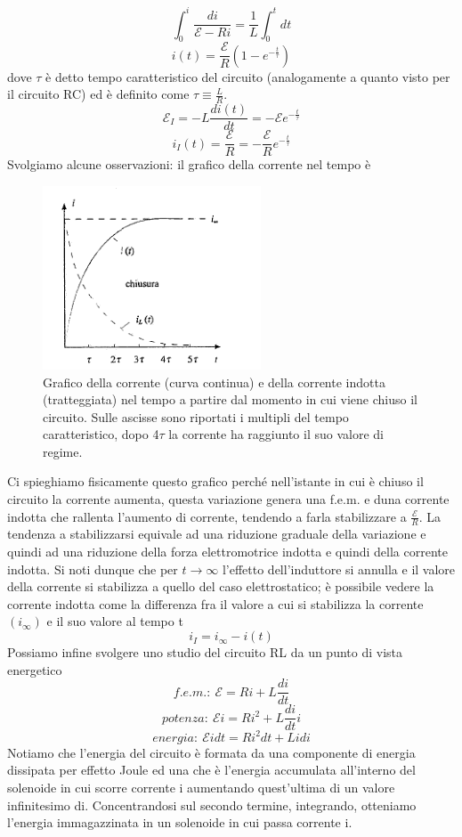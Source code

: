\documentclass[
10pt, %
a4paper, %
oneside, %
headinclude,footinclude, %
BCOR5mm, %
]{scrartcl}
\begin{document}
\[\int_{0}^{i}\frac{di}{\mathcal{E}-Ri} = \frac{1}{L}\int_{0}^{t}dt\]
\[i(t) = \frac{\mathcal{E}}{R}(1-e^{-\frac{t}{\tau}})\]
dove $\tau$ è detto tempo caratteristico del circuito (analogamente a quanto visto per il circuito RC) ed è definito come \(\tau \equiv \frac{L}{R}\).
\[\mathcal{E}_I = -L\frac{di(t)}{dt}=-\mathcal{E}e^{-\frac{t}{\tau}}\]
\[i_I(t) = \frac{\mathcal{E}}{R} = -\frac{\mathcal{E}}{R}e^{-\frac{t}{\tau}}\]
Svolgiamo alcune osservazioni: il grafico della corrente nel tempo è
\begin{figure}[h!]
	\centering
	\includegraphics[width=0.4\linewidth]{../images/corrente_RL}
	\caption{Grafico della corrente (curva continua) e della corrente indotta (tratteggiata) nel tempo a partire dal momento in cui viene chiuso il circuito. Sulle ascisse sono riportati i multipli del tempo caratteristico, dopo 4\(\tau\) la corrente ha raggiunto il suo valore di regime.}
	\label{fig:correnterl}
\end{figure}
\FloatBarrier
Ci spieghiamo fisicamente questo grafico perché nell'istante in cui è chiuso il circuito la corrente aumenta, questa variazione genera una f.e.m. e duna corrente indotta che rallenta l'aumento di corrente, tendendo a farla stabilizzare a \(\frac{\mathcal{E}}{R}\). La tendenza a stabilizzarsi equivale ad una riduzione graduale della variazione e quindi ad una riduzione della forza elettromotrice indotta e quindi della corrente indotta. Si noti dunque che per \(t\to\infty\) l'effetto dell'induttore si annulla e il valore della corrente si stabilizza a quello del caso elettrostatico; è possibile vedere la corrente indotta come la differenza fra il valore a cui si stabilizza la corrente \((i_{\infty})\) e il suo valore al tempo t
\[i_I = i_\infty - i(t)\]
Possiamo infine svolgere uno studio del circuito RL da un punto di vista energetico
\[f.e.m.:\ \mathcal{E} = Ri+L\frac{di}{dt}\]
\[potenza:\ \mathcal{E}i = Ri^2+L\frac{di}{dt}i\]
\[energia:\  \mathcal{E}idt = Ri^2dt+Lidi\]
Notiamo che l'energia del circuito è formata da una componente di energia dissipata per effetto Joule ed una che è l'energia accumulata all'interno del solenoide in cui scorre corrente i aumentando quest'ultima di un valore infinitesimo di. Concentrandosi sul secondo termine, integrando, otteniamo l'energia immagazzinata in un solenoide in cui passa corrente i. 
\end{document}
